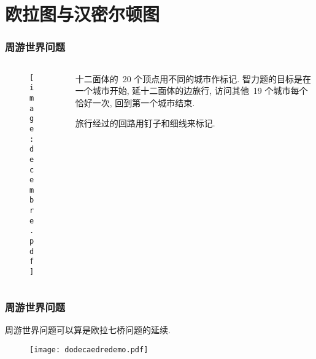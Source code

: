 \documentclass[serif,envcountsect]{beamer}
\begin{document}
\section{欧拉图与汉密尔顿图}

\begin{frame}\frametitle{周游世界问题}

\begin{columns}
\begin{column}{0.65\textwidth}
 \begin{figure}
   \begin{center}
   \texttt{[image: decembre.pdf]}
   \end{center}
 \end{figure}
\end{column}
\begin{column}{0.35\textwidth}
\begin{block}{}
十二面体的~20 个顶点用不同的城市作标记. 智力题的目标是在一个城市开始, 延十二面体的边旅行,
访问其他~19 个城市每个恰好一次, 回到第一个城市结束.

旅行经过的回路用钉子和细线来标记.
\end{block}
\end{column}
\end{columns}
\end{frame}

\begin{frame}[t]\frametitle{周游世界问题}
周游世界问题可以算是欧拉七桥问题的延续.

\begin{figure}
 \begin{center}
 \texttt{[image: dodecaedredemo.pdf]}\qquad
 \pause
 \end{center}
 \end{figure}
\end{frame}
\end{document}
